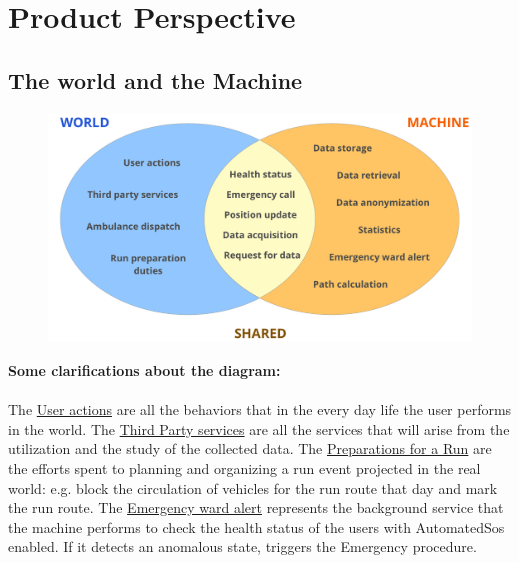 \section{Product Perspective}
\subsection{The world and the Machine}
\begin{figure}[H]
    \centering
    \includegraphics[scale=0.4]{rasdL/Pictures/worldmachine.png}

\end{figure}

\textbf{Some clarifications about the diagram:}\\ \\
The \underline{User actions} are all the behaviors that in the every day life the user performs in the world. The \underline{Third Party services} are all the services that will arise from the utilization and the study of the collected data. The \underline{Preparations for a Run} are the efforts spent to planning and organizing a run event projected in the real world: e.g. block the circulation of vehicles for the run route that day and mark the run route. The \underline{Emergency ward alert} represents the background service that the machine performs to check the health status
of the users with AutomatedSos enabled. If it detects an anomalous state, triggers the Emergency procedure.

\newpage
